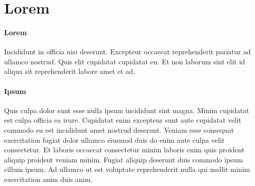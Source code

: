 \section{Lorem}

\paragraph{Lorem}Incididunt in officia nisi deserunt. Excepteur occaecat reprehenderit pariatur ad ullamco nostrud. 
Quis elit cupidatat cupidatat eu. Et non laborum sint elit id aliqua sit reprehenderit labore amet et ad.

\paragraph{Ipsum}Quis culpa dolor sunt esse nulla ipsum incididunt sint magna. Minim cupidatat est culpa officia 
ea irure. Cupidatat enim excepteur sunt aute cupidatat velit commodo eu est incididunt amet nostrud deserunt. 
Veniam esse consequat exercitation fugiat dolor ullamco eiusmod duis do enim aute culpa velit consectetur. Et 
laboris occaecat consectetur minim laboris enim quis proident aliquip proident veniam minim. Fugiat aliquip 
deserunt duis commodo ipsum cillum ipsum. Ad ullamco ut est voluptate reprehenderit nulla qui mollit minim 
exercitation anim duis anim.